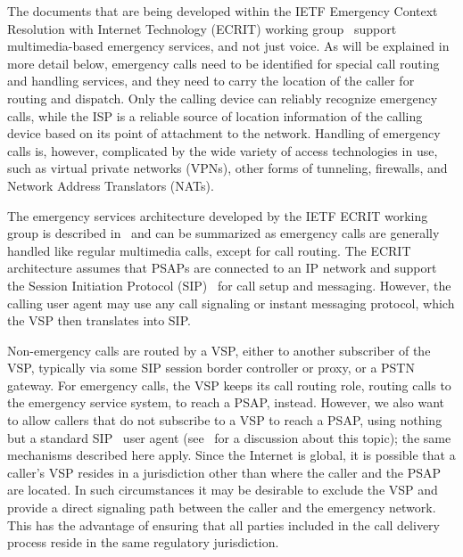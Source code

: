 \documentclass[12pt]{article}
\begin{document}
The documents that are being developed within the IETF Emergency Context Resolution with Internet Technology (ECRIT) working group~\cite{ecrit-wg} support multimedia-based emergency services, and not just voice. As will be explained in more detail below, emergency calls need to be identified for special call routing and handling services, and they need to carry the location of the caller for routing and dispatch. Only the calling device can reliably recognize emergency calls, while the ISP is a reliable source of location information of the calling device based on its point of attachment to the network. Handling of emergency calls is, however, complicated by the wide variety of access technologies in use, such as virtual private networks (VPNs), other forms of tunneling, firewalls, and Network Address Translators (NATs).

The emergency services architecture developed by the IETF ECRIT working group is described in~\cite{rfc6443} and can be summarized as emergency calls are generally handled like regular multimedia calls, except for call routing. The ECRIT architecture assumes that PSAPs are connected to an IP network and support the Session Initiation Protocol (SIP)~\cite{rfc3261} for call setup and messaging. However, the calling user agent may use any call signaling or instant messaging protocol, which the VSP then translates into SIP.

Non-emergency calls are routed by a VSP, either to another subscriber of the VSP, typically via some SIP session border controller or proxy, or a PSTN gateway. For emergency calls, the VSP keeps its call routing role, routing calls to the emergency service system, to reach a PSAP, instead. However, we also want to allow callers that do not subscribe to a VSP to reach a PSAP, using nothing but a standard SIP~\cite{rfc3261} user agent (see~\cite{draft-ietf-ecrit-unauthenticated-access} for a discussion about this topic); the same mechanisms described here apply. Since the Internet is global, it is possible that a caller's VSP resides in a jurisdiction other than where the caller and the PSAP are located. In such circumstances it may be desirable to exclude the VSP and provide a direct signaling path between the caller and the emergency network. This has the advantage of ensuring that all parties included in the call delivery process reside in the same regulatory jurisdiction.
\end{document}
